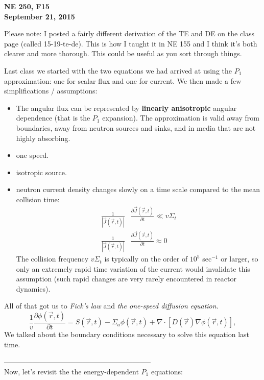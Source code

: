 \documentclass[12pt]{article}
\newcommand{\rvec}{\ensuremath{\vec{r}}}
\begin{document}
\begin{center}
{\bf NE 250, F15 \\
September 21, 2015}
\end{center}

Please note: I posted a fairly different derivation of the TE and DE on the class page (called 15-19-te-de). This is how I taught it in NE 155 and I think it's both clearer and more thorough. This could be useful as you sort through things. 

Last class we started with the two equations we had arrived at using the $P_1$ approximation: one for scalar flux and one for current. We then made a few simplifications / assumptions:
\begin{itemize}
\item The angular flux can be represented by \textbf{linearly anisotropic} angular dependence (that is the $P_1$ expansion). 
The approximation is valid away from boundaries, away from neutron sources and sinks, and in media that are not highly absorbing.
\item one speed.
\item isotropic source.
\item neutron current density changes slowly on a time scale compared to the mean collision time:
\begin{align*}
\frac{1}{|\vec{J}(\rvec,t)|}&\frac{\partial\vec{J}(\rvec,t)}{\partial t} \ll v\Sigma_t \\ \frac{1}{|\vec{J}(\rvec,t)|}&\frac{\partial\vec{J}(\rvec,t)}{\partial t}\approx 0
\end{align*}
The collision frequency $v\Sigma_t$ is typically on the order of $10^5$ sec$^{-1}$ or larger, so only an extremely rapid time variation of the current would invalidate this assumption (such rapid changes are very rarely encountered in reactor dynamics).
\end{itemize}

All of that got us to \textit{Fick's law} and \textit{the one-speed diffusion equation}.  
%
\begin{equation*}
\frac{1}{v}\frac{\partial\phi(\rvec,t)}{\partial t} = S(\rvec,t) - \Sigma_a\phi(\rvec,t) + 
\nabla\cdot[D(\rvec)\nabla\phi(\rvec,t)],
\end{equation*}
%
We talked about the boundary conditions necessary to solve this equation last time. 

--------------------------------------------------------------\\
Now, let's revisit the the energy-dependent $P_1$ equations:
\end{document}
